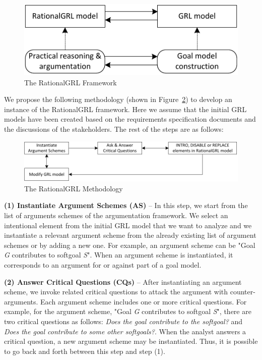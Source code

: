 \begin{figure}[ht]
\centering
\includegraphics[scale=0.4]{img/framework}
\caption{The RationalGRL Framework}
\label{fig:rationalgrl-framework}
\end{figure}

We propose the following methodology (shown in Figure~\ref{fig:rationalgrl-methodology}) to develop an instance of the RationalGRL framework. Here we assume that the initial GRL models have been created based on the requirements specification documents and the discussions of the stakeholders. The rest of the steps are as follows:

\begin{figure}[ht]
\centering
\includegraphics[scale=0.4]{img/methodology}
\caption{The RationalGRL Methodology}
\label{fig:rationalgrl-methodology}
\end{figure}


\textbf{(1) Instantiate Argument Schemes (AS)} -- In this step, we start from the list of arguments schemes of the argumentation framework. We select an intentional element from the initial GRL model that we want to analyze and we instantiate a relevant argument scheme from the already existing list of argument schemes or by adding a new one. For example, an argument scheme can be "Goal \emph{G} contributes to softgoal \emph{S}". When an argument scheme is instantiated, it corresponds to  an argument for or against part of a goal model.

\textbf{(2) Answer Critical Questions (CQs)} -- After instantiating an argument scheme, we invoke related critical questions to attack the argument with counter-arguments.  Each argument scheme includes one or more critical questions. For example, for the argument scheme, "Goal \emph{G} contributes to softgoal \emph{S}", there are two critical questions as follows:  \emph{Does the goal contribute to the softgoal?} and \emph{Does the goal contribute to some other softgoals?}. 
When the analyst answers  a critical question, a new argument scheme may be instantiated.  Thus, it is possible to go back and forth between this step and step (1).

